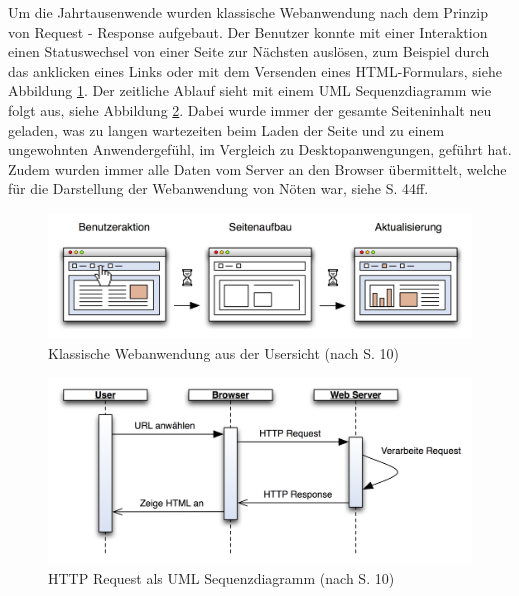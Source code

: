   Um die Jahrtausenwende wurden klassische Webanwendung nach dem Prinzip von
  Request - Response aufgebaut. Der Benutzer konnte mit einer Interaktion einen
  Statuswechsel von einer Seite zur Nächsten auslösen, zum Beispiel durch das
  anklicken eines Links oder mit dem Versenden eines HTML-Formulars, siehe
  Abbildung \ref{img:classicPageReload}. Der zeitliche Ablauf sieht mit einem
  \ac{UML} Sequenzdiagramm wie folgt aus, siehe Abbildung
  \ref{img:sequenzdiagrammClassicPageReload}. Dabei wurde immer der gesamte
  Seiteninhalt neu geladen, was zu langen wartezeiten beim Laden der Seite und
  zu einem ungewohnten Anwendergefühl, im Vergleich zu Desktopanwengungen,
  geführt hat. Zudem wurden immer alle Daten vom Server an den Browser
  übermittelt, welche für die Darstellung der Webanwendung von Nöten war, siehe
  \cite{AjaxInAction} S. 44ff.
  
  \begin{figure}[hbt]
    \begin{center}
      \includegraphics[width=\textwidth]{./image/classicPageReload.png}
      \caption{Klassische Webanwendung aus der Usersicht (nach
      \cite{DiplomarbeitStephanSchuster} S. 10)}
      \label{img:classicPageReload}
    \end{center}
  \end{figure}
  
  \begin{figure}[hbt]
    \begin{center}
      \includegraphics[width=\textwidth]{./image/sequenzdiagrammClassicPageReload.png}
      \caption{HTTP Request als \ac{UML} Sequenzdiagramm (nach
      \cite{HttpBasics} S. 10)}
      \label{img:sequenzdiagrammClassicPageReload}
    \end{center}
  \end{figure}
  
